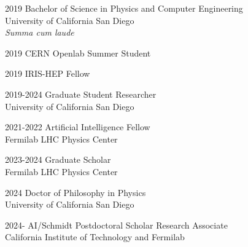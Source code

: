 \documentclass[12pt]{ucsddissertation}
\theoremstyle{definition}
\theoremstyle{definition}
\theoremstyle{definition}
\numberwithin{equation}{section}
\begin{document}
\begin{vita}
\noindent
\begin{cv}{}
\begin{cvlist}{}
\item[2019] Bachelor of Science in Physics and Computer Engineering\\
            University of California San Diego\\
            \textit{Summa cum laude}
\item[2019] CERN Openlab Summer Student
\item[2019] IRIS-HEP Fellow
\item[2019-2024] Graduate Student Researcher\\University of California San Diego
\item[2021-2022] Artificial Intelligence Fellow\\Fermilab LHC Physics Center
\item[2023-2024] Graduate Scholar\\Fermilab LHC Physics Center
\item[2024] Doctor of Philosophy in Physics\\University of California San Diego
\item[2024-] AI/Schmidt Postdoctoral Scholar Research Associate\\California Institute of Technology and Fermilab
\end{cvlist}
\end{cv}

\publications


\end{vita}
\end{document}
